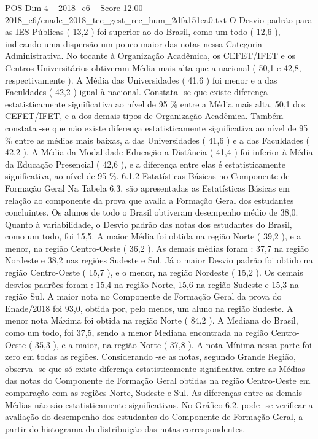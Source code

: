 \begin{textsample}{POS Dim 4 – 2018\_c6 – Score 12.00 – 2018\_c6/enade\_2018\_tec\_gest\_rec\_hum\_2dfa151ea0.txt}
O Desvio padrão para as IES Públicas ( 13,2 ) foi superior ao do Brasil, como um todo ( 12,6 ), indicando uma dispersão um pouco maior das notas nessa Categoria Administrativa.
No tocante à Organização Acadêmica, os CEFET/IFET e os Centros Universitários obtiveram Média mais alta que a nacional ( 50,1 e 42,8, respectivamente ).
A Média das Universidades ( 41,6 ) foi menor e a das Faculdades ( 42,2 ) igual à nacional.
Constata -se que existe diferença estatisticamente significativa ao nível de 95 \% entre a Média mais alta, 50,1 dos CEFET/IFET, e a dos demais tipos de Organização Acadêmica.
Também constata -se que não existe diferença estatisticamente significativa ao nível de 95 \% entre as médias mais baixas, a das Universidades ( 41,6 ) e a das Faculdades ( 42,2 ).
A Média da Modalidade Educação a Distância ( 41,4 ) foi inferior à Média da Educação Presencial ( 42,6 ), e a diferença entre elas é estatisticamente significativa, ao nível de 95 \%. 6.1.2 Estatísticas Básicas no Componente de Formação Geral Na Tabela 6.3, são apresentadas as Estatísticas Básicas em relação ao componente da prova que avalia a Formação Geral dos estudantes concluintes.
Os alunos de todo o Brasil obtiveram desempenho médio de 38,0.
Quanto à variabilidade, o Desvio padrão das notas dos estudantes do Brasil, como um todo, foi 15,5.
A maior Média foi obtida na região Norte ( 39,2 ), e a menor, na região Centro-Oeste ( 36,2 ).
As demais médias foram : 37,7 na região Nordeste e 38,2 nas regiões Sudeste e Sul.
Já o maior Desvio padrão foi obtido na região Centro-Oeste ( 15,7 ), e o menor, na região Nordeste ( 15,2 ).
Os demais desvios padrões foram : 15,4 na região Norte, 15,6 na região Sudeste e 15,3 na região Sul.
A maior nota no Componente de Formação Geral da prova do Enade/2018 foi 93,0, obtida por, pelo menos, um aluno na região Sudeste.
A menor nota Máxima foi obtida na região Norte ( 84,2 ).
A Mediana do Brasil, como um todo, foi 37,5, sendo a menor Mediana encontrada na região Centro-Oeste ( 35,3 ), e a maior, na região Norte ( 37,8 ).
A nota Mínima nessa parte foi zero em todas as regiões.
Considerando -se as notas, segundo Grande Região, observa -se que só existe diferença estatisticamente significativa entre as Médias das notas do Componente de Formação Geral obtidas na região Centro-Oeste em comparação com as regiões Norte, Sudeste e Sul.
As diferenças entre as demais Médias não são estatisticamente significativas.
No Gráfico 6.2, pode -se verificar a avaliação do desempenho dos estudantes do Componente de Formação Geral, a partir do histograma da distribuição das notas correspondentes.

\end{textsample}
